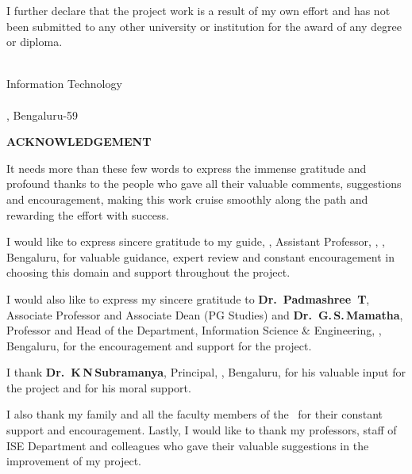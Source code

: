        I further declare that the project work is a result of my own effort and has not been submitted to any other university or institution for the award of any degree or diploma.
    
        \vspace{36pt}
        \begin{flushright}
        \textbf{\StudentName}\\
        Information Technology\\
        \Dept\\
        \College, Bengaluru-59
        \end{flushright}
    
        \newpage
        \thispagestyle{empty}
        \begin{center}
        {\Large\bfseries ACKNOWLEDGEMENT}
        \end{center}
        \vspace{12pt}
    
        It needs more than these few words to express the immense gratitude and profound thanks to the people who gave all their valuable comments, suggestions and encouragement, making this work cruise smoothly along the path and rewarding the effort with success.
    
        I would like to express sincere gratitude to my guide, \textbf{\GuideName}, Assistant Professor, \Dept, \College, Bengaluru, for valuable guidance, expert review and constant encouragement in choosing this domain and support throughout the project.
    
        I would also like to express my sincere gratitude to \textbf{Dr.\ Padmashree~T}, Associate Professor and Associate Dean (PG Studies) and \textbf{Dr.\ G.\,S.\,Mamatha}, Professor and Head of the Department, Information Science \& Engineering, \College, Bengaluru, for the encouragement and support for the project.
    
        I thank \textbf{Dr.\ K\,N\,Subramanya}, Principal, \College, Bengaluru, for his valuable input for the project and for his moral support.
    
        I also thank my family and all the faculty members of the \Dept\ for their constant support and encouragement. Lastly, I would like to thank my professors, staff of ISE Department and colleagues who gave their valuable suggestions in the improvement of my project.
    
